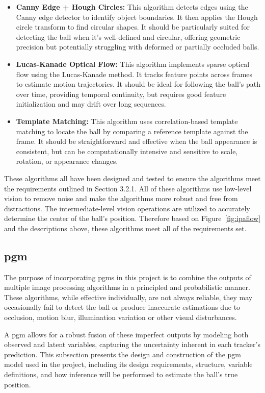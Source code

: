 \documentclass[12pt,a4paper]{article}
\begin{document}
\begin{itemize}
    \item \textbf{Canny Edge + Hough Circles:} This algorithm detects edges using the Canny edge detector to identify object boundaries. It then applies the Hough circle transform to find circular shapes. It should be particularly suited for detecting the ball when it's well-defined and circular, offering geometric precision but potentially struggling with deformed or partially occluded balls.
    
    \item \textbf{Lucas-Kanade Optical Flow:} This algorithm implements sparse optical flow using the Lucas-Kanade method. It tracks feature points across frames to estimate motion trajectories. It should be ideal for following the ball's path over time, providing temporal continuity, but requires good feature initialization and may drift over long sequences.
    
    \item \textbf{Template Matching:} This algorithm uses correlation-based template matching to locate the ball by comparing a reference template against the frame. It should be straightforward and effective when the ball appearance is consistent, but can be computationally intensive and sensitive to scale, rotation, or appearance changes.
\end{itemize}

These algorithms all have been designed and tested to ensure the algorithms meet the requirements outlined in Section 3.2.1. All of these algorithms use low-level vision to remove noise and make the algorithms more robust and free from distractions. The intermediate-level vision operations are utilized to accurately determine the center of the ball's position. Therefore based on Figure~\ref{fig:ipaflow} and the descriptions above, these algorithms meet all of the requirements set.

\subsection{\acl{pgm}}
The purpose of incorporating \acp{pgm} in this project is to combine the outputs of multiple image processing algorithms in a principled and probabilistic manner. These algorithms, while effective individually, are not always reliable, they may occasionally fail to detect the ball or produce inaccurate estimations due to occlusion, motion blur, illumination variation or other visual disturbances. 

A \acs{pgm} allows for a robust fusion of these imperfect outputs by modeling both observed and latent variables, capturing the uncertainty inherent in each tracker’s prediction. This subsection presents the design and construction of the \acs{pgm} model used in the project, including its design requirements, structure, variable definitions, and how inference will be performed to estimate the ball's true position.
\end{document}
